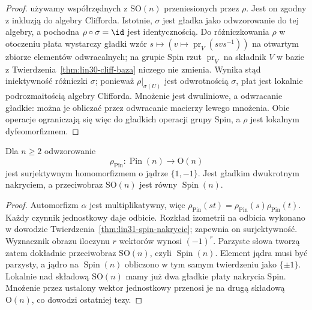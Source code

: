 \begin{proof}
używamy współrzędnych z $\mathrm{SO}(n)$ przeniesionych przez $\rho$.
Jest on zgodny z inkluzją do algebry Clifforda. Istotnie,
$\sigma$ jest gładka jako odwzorowanie do tej algebry, a pochodna
$\rho\circ\sigma=\id$ jest identycznością. Do różniczkowania
$\rho$ w otoczeniu płata wystarczy gładki wzór
$s\mapsto(v\mapsto\operatorname{pr}_V(svs^{-1}))$
na otwartym zbiorze elementów odwracalnych; na grupie Spin
rzut $\operatorname{pr}_V$ na składnik $V$ w bazie
z Twierdzenia~\ref{thm:lin30-cliff-baza} niczego nie zmienia.
Wynika stąd iniektywność różniczki $\sigma$; ponieważ
$\rho|_{\sigma(U)}$ jest odwrotnością $\sigma$, płat
jest lokalnie podrozmaitością algebry Clifforda. Mnożenie jest
dwuliniowe, a odwracanie gładkie: można je obliczać przez
odwracanie macierzy lewego mnożenia. Obie operacje ograniczają
się więc do gładkich operacji grupy Spin, a $\rho$ jest lokalnym dyfeomorfizmem.
\end{proof}

\begin{wniosek}
\label{cor:lin31-pin-nakrycie}
Dla $n\geq2$ odwzorowanie
\[
 \rho_{\mathrm{Pin}}:\operatorname{Pin}(n)\longrightarrow
 \mathrm O(n)
\]
jest surjektywnym homomorfizmem o jądrze $\{1,-1\}$.
Jest gładkim dwukrotnym nakryciem, a przeciwobraz
$\mathrm{SO}(n)$ jest równy $\operatorname{Spin}(n)$.
\end{wniosek}
\begin{proof}
Automorfizm $\alpha$ jest multiplikatywny, więc
$\rho_{\mathrm{Pin}}(st)=\rho_{\mathrm{Pin}}(s)
\rho_{\mathrm{Pin}}(t)$. Każdy czynnik jednostkowy
daje odbicie. Rozkład izometrii na odbicia wykonano
w dowodzie Twierdzenia~\ref{thm:lin31-spin-nakrycie}; zapewnia
on surjektywność. Wyznacznik obrazu iloczynu $r$
wektorów wynosi $(-1)^r$. Parzyste słowa tworzą
zatem dokładnie przeciwobraz $\mathrm{SO}(n)$, czyli
$\operatorname{Spin}(n)$. Element jądra musi być parzysty,
a jądro na $\operatorname{Spin}(n)$ obliczono w tym samym
twierdzeniu jako $\{\pm1\}$. Lokalnie nad składową
$\mathrm{SO}(n)$ mamy już dwa gładkie płaty nakrycia Spin.
Mnożenie przez ustalony wektor jednostkowy przenosi je
na drugą składową $\mathrm O(n)$, co dowodzi ostatniej tezy.
\end{proof}

